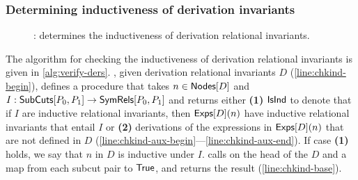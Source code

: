 \subsubsection{Determining inductiveness of derivation invariants}
\label{sec:chk-ind}
\begin{figure}
  \centering
  \begin{algorithm}[H]
    {  %
      { %
        {
          \Return{$\true$}
        }
      \label{line:chkind-aux-end} } %
    \label{line:chkind-base} } %
    \caption{%
      \chkinductive: determines the inductiveness of derivation
      relational invariants. }
    \label{alg:verify-ders}
  \end{algorithm}
\end{figure}
%
The algorithm \chkinductive for checking the inductiveness of
derivation relational invariants is given in
\autoref{alg:verify-ders}.
%
\chkinductive, given derivation relational invariants $D$
(\autoref{line:chkind-begin}), defines a procedure \chkindaux that
takes $n \in \mathsf{Nodes}[ D ]$ and $I: \mathsf{SubCuts}[ P_0, P_1 ] \to
\mathsf{SymRels}[ P_0, P_1 ]$ and returns either %
\textbf{(1)} $\mathsf{IsInd}$ to denote that if $I$ are inductive relational
invariants, then $\mathsf{Exps}[ D ](n)$ have inductive relational
invariants that entail $I$ or
%
\textbf{(2)} derivations of the expressions in $\mathsf{Exps}[ D ](n)$ that
are not defined in $D$
(\autoref{line:chkind-aux-begin}---\autoref{line:chkind-aux-end}).
%
If case \textbf{(1)} holds, we say that $n$ in $D$ is inductive under
$I$.
%
\chkinductive calls \chkindaux on the head of the $D$ and a map from
each subcut pair to $\true$, and returns the result
(\autoref{line:chkind-base}).

